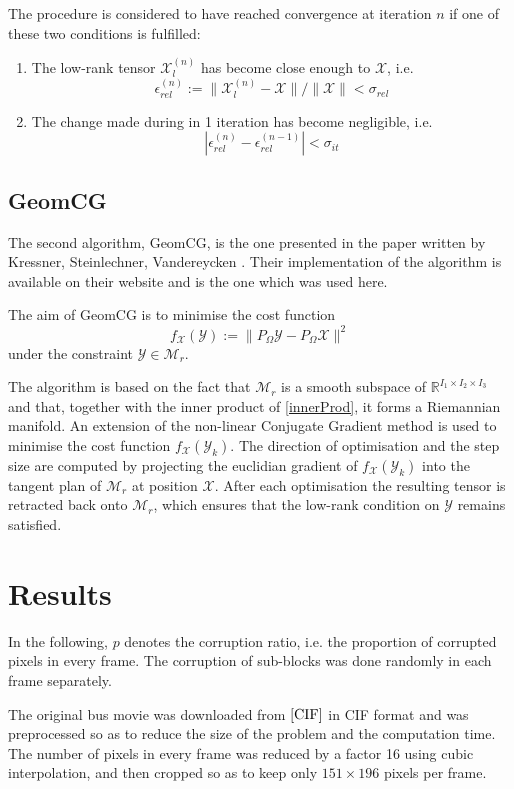 \documentclass[a4paper, 11pt]{article} %
\def \be {\begin{equation*}}
\def \ee {\end{equation*}}
\def \X {\mathcal{X}}
\def \R {\mathbb{R}}
\def \t {\times}
\def \Y {\mathcal{Y}}
\def \Mr {\mathcal{M}_{r}}
\def \Xl {\mathcal{X}_{l}}
\begin{document}
The procedure is considered to have reached convergence at iteration $n$ if one of these two conditions is fulfilled:
\begin{enumerate}
\item The low-rank tensor $\Xl^{(n)}$ has become close enough to $\X$, i.e.
\be
 \epsilon_{rel}^{(n)}:=\|\Xl^{(n)}-\X \|/\| \X\|<\sigma_{rel}
\ee
\item The change made during in 1 iteration has become negligible, i.e. 
\be
|\epsilon_{rel}^{(n)}-\epsilon_{rel}^{(n-1)}|<\sigma_{it}
\ee
\end{enumerate}

\subsection{GeomCG}
The second algorithm, GeomCG, is the one presented in the paper written by Kressner, Steinlechner, Vandereycken \cite{GeomCG}. Their implementation of the algorithm is available on their website \cite{SiteANCHP} and is the one which was used here.

The aim of GeomCG is to minimise the cost function
\be
f_{\X}(\Y):=\| P_{\Omega}\Y-P_{\Omega}\X\|^2
\ee
under the constraint $\Y \in \Mr$.

The algorithm is based on the fact that $\Mr$  is a smooth subspace of $\R^{I_1\t I_2 \t I_3}$ and that, together with the inner product of \autoref{innerProd}, it forms a Riemannian manifold.
An extension of the non-linear Conjugate Gradient method is used to minimise the cost function $f_{\X}(\Y_k)$. The direction of optimisation and the step size are computed by projecting the euclidian gradient of $f_{\X}(\Y_k)$ into the tangent plan of $\Mr$ at position $\X$. After each optimisation the resulting tensor is retracted back onto $\Mr$, which ensures that the low-rank condition on $\Y$ remains satisfied.
\section{Results}
In the following, $p$ denotes the corruption ratio, i.e. the proportion of corrupted pixels in every frame. The corruption of sub-blocks was done randomly in each frame separately.

The original bus movie was downloaded from $\cite{CIF}$ in CIF format and was preprocessed so as to reduce the size of the problem and the computation time. The number of pixels in every frame was reduced by a factor 16 using cubic interpolation, and then cropped so as to keep only $151\t 196$ pixels per frame.
\end{document}
